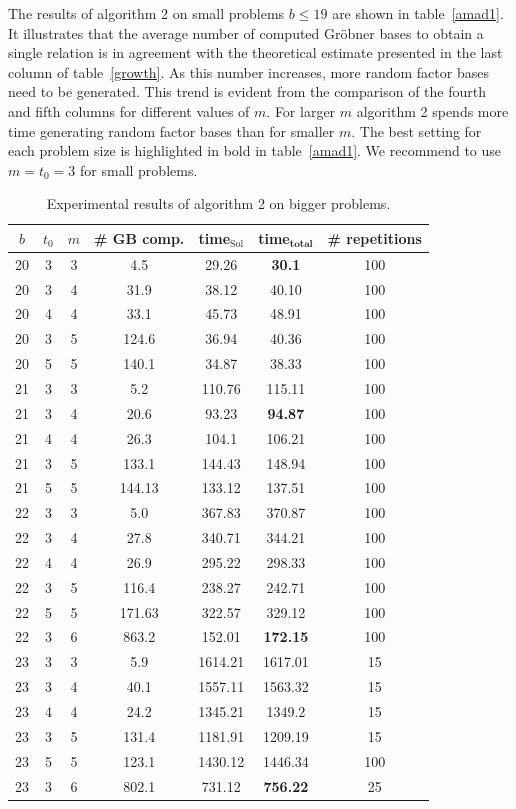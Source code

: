 \documentclass[thesis=M,english]{FITthesis}[2012/10/20]
\theoremstyle{remark}
\theoremstyle{definition}
\begin{document}
\noindent The results of algorithm 2 on small problems $b \leq 19$ are shown in table~\ref{amad1}. It illustrates that the average number of computed Gröbner bases to obtain a single relation is in agreement with the theoretical estimate presented in the last column of table~\ref{growth}. As this number increases, more random factor bases need to be generated. This trend is evident from the comparison of the fourth and fifth columns for different values of $m$.  For larger $m$ algorithm 2 spends more time generating random factor bases than for smaller $m$. The best setting for each problem size is highlighted in bold in table~\ref{amad1}. We recommend to use $m=t_0=3$ for small problems.
\begin{table}[H]
\centering
\begin{tabular}{ |c||c|c|c|c|c|c| } 
 \hline
$b$ & $t_0$ & $m$ & \# GB comp. & time$_\text{Sol}$ & \textbf{time}$_\textbf{total}$ & \# repetitions \\
 \hline
 \hline
20 & 3 & 3 & 4.5 & 29.26 & \textbf{30.1}& 100 \\ \hline
20 & 3 & 4 & 31.9 & 38.12 & 40.10 & 100 \\ \hline 
20 & 4 & 4 & 33.1 & 45.73 & 48.91 & 100 \\ \hline 
20 & 3 & 5& 124.6 & 36.94 & 40.36 & 100 \\ \hline 
20 & 5 & 5 & 140.1 & 34.87 & 38.33 & 100 \\ \hline \hline
21 & 3 & 3 & 5.2 & 110.76 & 115.11 & 100 \\ \hline
21 & 3 & 4 & 20.6 & 93.23 & \textbf{94.87} & 100 \\ \hline
21 & 4 & 4 & 26.3 & 104.1 & 106.21 & 100 \\ \hline
21 & 3 & 5& 133.1 & 144.43 & 148.94 & 100 \\ \hline 
21 & 5 & 5 & 144.13 & 133.12 & 137.51 & 100 \\ \hline \hline
22 & 3 & 3 & 5.0 & 367.83 & 370.87 & 100 \\ \hline
22 & 3 & 4 & 27.8 & 340.71 & 344.21 & 100 \\ \hline
22 & 4 & 4 & 26.9 & 295.22 & 298.33 & 100 \\ \hline 
22 & 3 & 5& 116.4 & 238.27 & 242.71 & 100 \\ \hline 
22 & 5 & 5 & 171.63 & 322.57 & 329.12 & 100 \\ \hline 
22 & 3 & 6 & 863.2 & 152.01 & \textbf{172.15} & 100 \\ \hline \hline
23 & 3 & 3 & 5.9 & 1614.21 & 1617.01 & 15 \\ \hline
23 & 3 & 4 & 40.1 & 1557.11 & 1563.32 & 15 \\ \hline
23 & 4 & 4 & 24.2 & 1345.21 & 1349.2 & 15 \\ \hline 
23 & 3 & 5& 131.4 & 1181.91 & 1209.19 & 15 \\ \hline 
23 & 5 & 5 & 123.1 & 1430.12 & 1446.34 & 100 \\ \hline 
23 & 3 & 6 & 802.1 & 731.12 & \textbf{756.22} & 25 \\ \hline 
\end{tabular}
\caption[Experimental results of algorithm 2 on bigger problems]{Experimental results of algorithm 2 on bigger problems.}
\label{amad2}
\end{table}
\end{document}

